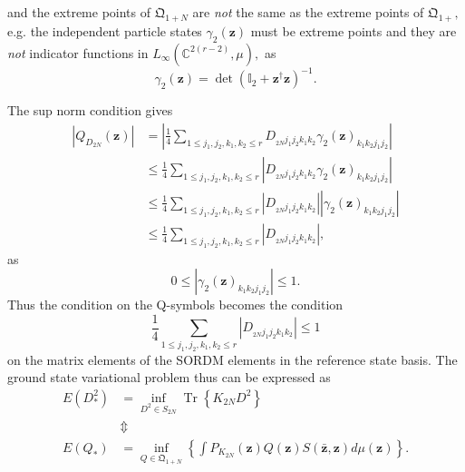 \documentclass[aps,preprint]{revtex4}%
\begin{document}
and the extreme points of $\mathfrak{Q}_{1+N}$ are \emph{not} the same as the
extreme points of $\mathfrak{Q}_{1+},$ e.g. the independent particle states
$\gamma_{2}\left(  \mathbf{z}\right)  $ must be extreme points and they are
\emph{not} indicator functions in $L_{\infty}\left(  \mathbb{C}^{2\left(
r-2\right)  },\mu\right)  ,$ as
\begin{equation}
\gamma_{2}\left(  \mathbf{z}\right)  =\det\left(  \mathbb{I}_{2}%
+\mathbf{z}^{\dagger}\mathbf{z}\right)  ^{-1}.
\end{equation}


The sup norm condition gives
\begin{align}
\left\vert Q_{D_{2N}}\left(  \mathbf{z}\right)  \right\vert  &  =\left\vert
\frac{1}{4}\sum_{1\leq j_{1},j_{2},k_{1},k_{2}\leq r}D_{_{2N}j_{1}j_{2}%
k_{1}k_{2}}\gamma_{2}\left(  \mathbf{z}\right)  _{k_{1}k_{2}j_{1}j_{2}%
}\right\vert \nonumber\\
&  \leq\frac{1}{4}\sum_{1\leq j_{1},j_{2},k_{1},k_{2}\leq r}\left\vert
D_{_{2N}j_{1}j_{2}k_{1}k_{2}}\gamma_{2}\left(  \mathbf{z}\right)  _{k_{1}%
k_{2}j_{1}j_{2}}\right\vert \nonumber\\
&  \leq\frac{1}{4}\sum_{1\leq j_{1},j_{2},k_{1},k_{2}\leq r}\left\vert
D_{_{2N}j_{1}j_{2}k_{1}k_{2}}\right\vert \left\vert \gamma_{2}\left(
\mathbf{z}\right)  _{k_{1}k_{2}j_{1}j_{2}}\right\vert \nonumber\\
&  \leq\frac{1}{4}\sum_{1\leq j_{1},j_{2},k_{1},k_{2}\leq r}\left\vert
D_{_{2N}j_{1}j_{2}k_{1}k_{2}}\right\vert ,
\end{align}
as
\begin{equation}
0\leq\left\vert \gamma_{2}\left(  \mathbf{z}\right)  _{k_{1}k_{2}j_{1}j_{2}%
}\right\vert \leq1.
\end{equation}
Thus the condition on the Q-symbols becomes the condition
\begin{equation}
\frac{1}{4}\sum_{1\leq j_{1},j_{2},k_{1},k_{2}\leq r}\left\vert D_{_{2N}%
j_{1}j_{2}k_{1}k_{2}}\right\vert \leq1
\end{equation}
on the matrix elements of the SORDM elements in the reference state basis. The
ground state variational problem thus can be expressed as
\begin{align}
E\left(  D_{\ast}^{2}\right)   &  =\inf_{D^{2}\in S_{2N}}\operatorname*{Tr}%
\left\{  K_{2N}D^{2}\right\} \nonumber\\
&  \Updownarrow\nonumber\\
E\left(  Q_{\ast}\right)   &  =\inf_{Q\in\mathfrak{Q}_{1+N}}\left\{  \int
P_{K_{2N}}\left(  \mathbf{z}\right)  Q\left(  \mathbf{z}\right)  S\left(
\mathbf{\bar{z},z}\right)  d\mu\left(  \mathbf{z}\right)  \right\}  .
\end{align}
\end{document}
